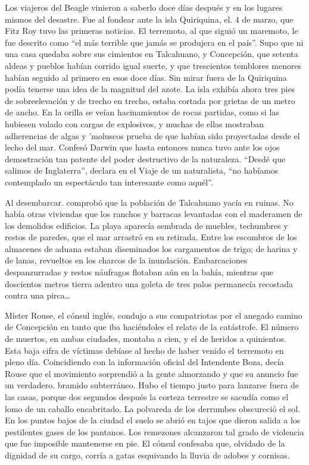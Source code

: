 \documentclass[10pt,twoside,openright]{memoir}
\begin{document}
Los viajeros del Beagle vinieron a saberlo doce días después y en los
lugares mismos del desastre. Fue al fondear ante la isla Quiriquina, el.
4 de marzo, que Fitz Roy tuvo las primeras noticias. El terremoto, al
que siguió un maremoto, le fue descrito como ``el más terrible que jamás
se produjera en el país''. Supo que ni una casa quedaba sobre sus
cimientos en Talcahuano, y Concepción, que setenta aldeas y pueblos
habían corrido igual suerte, y que trescientos temblores menores habían
seguido al primero en esos doce días. Sin mirar fuera de la Quiriquina
podía tenerse una idea de la magnitud del azote. La isla exhibía ahora
tres pies de sobreelevación y de trecho en trecho, estaba cortada por
grietas de un metro de ancho. En la orilla se veían hacinamientos de
rocas partidas, como si las hubiesen volado con cargas de explosivos, y
muchas de ellas mostraban adherencias de algas y 'moluscos prueba de que
habían sido proyectadas desde el lecho del mar. Confesó Darwin que hasta
entonces nunca tuvo ante los ojos demostración tan patente del poder
destructivo de la naturaleza. ``Desdé que salimos de Inglaterra'', declara
en el Viaje de un naturalista, ``no habíamos contemplado un espectáculo
tan interesante como aquél''.

Al desembarcar. comprobó que la población de Talcahuano yacía en ruinas.
No había otras viviendas que los ranchos y barracas levantadas con el
maderamen de los demolidos edificios. La playa aparecía sembrada de
muebles, techumbres y restos de paredes, que el mar arrastró en su
retirada. Entre los escombros de los almacenes de aduana estaban
diseminados los cargamentos de trigo; de harina y de lanas, revueltos en
los charcos de la inundación. Embarcaciones despanzurradas y restos
náufragos flotaban aún en la bahía, mientras que doscientos metros
tierra adentro una goleta de tres palos permanecía recostada contra una
pirca\ldots

Míster Rouse, el cónsul inglés, condujo a sus compatriotas por el
anegado camino de Concepción en tanto que iba haciéndoles el relato de
la catástrofe. El número de muertos, en ambas ciudades, montaba a cien,
y el de heridos a quinientos. Esta baja cifra de víctimas debíase al
hecho de haber venido el terremoto en pleno día. Coincidiendo con la
información oficial del Intendente Boza, decía Rouse que el movimiento
sorprendió a la gente almorzando y que su anuncio fue un verdadero.
bramido subterráneo. Hubo el tiempo justo para lanzarse fuera de las
casas, porque dos segundos después la corteza terrestre se sacudía como
el lomo de un caballo encabritado. La polvareda de los derrumbes
obscureció el sol. En los puntos bajos de la ciudad el suelo se abrió en
tajos que dieron salida a los pestilentes gases de los pantanos. Los
remezones alcanzaron tal grado de violencia que fue imposible mantenerse
en pie. El cónsul confesaba que, olvidado de la dignidad de su cargo,
corría a gatas esquivando la lluvia de adobes y cornisas.
\end{document}
